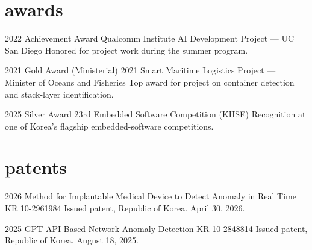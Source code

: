 \documentclass[]{cv-friggeri-x}
\begin{document}
\section{awards}

\begin{entrylist}
\entry
  {2022}
  {Achievement Award}
  {Qualcomm Institute AI Development Project --- UC San Diego}
  {Honored for project work during the summer program.}

\entry
  {2021}
  {Gold Award (Ministerial)}
  {2021 Smart Maritime Logistics Project --- Minister of Oceans and Fisheries}
  {Top award for project on container detection and stack-layer identification.}

\entry
  {2025}
  {Silver Award}
  {23rd Embedded Software Competition (KIISE)}
  {Recognition at one of Korea's flagship embedded-software competitions.}

\end{entrylist}

\section{patents}

\begin{entrylist}
\entry
  {2026}
  {Method for Implantable Medical Device to Detect Anomaly in Real Time}
  {KR 10-2961984}
  {Issued patent, Republic of Korea. April 30, 2026.}

\entry
  {2025}
  {GPT API-Based Network Anomaly Detection}
  {KR 10-2848814}
  {Issued patent, Republic of Korea. August 18, 2025.}

\end{entrylist}
\end{document}
